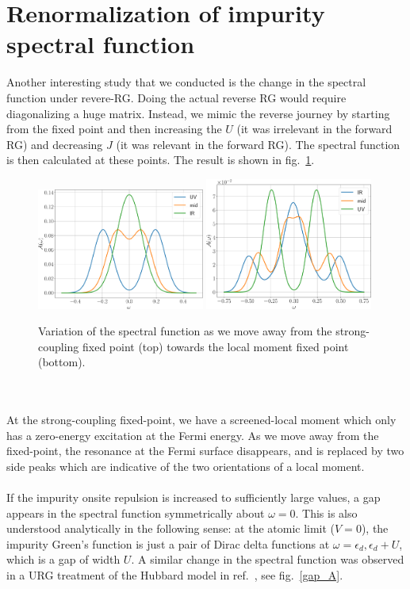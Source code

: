 \documentclass[twoside]{report}
\numberwithin{equation}{section}
\begin{document}
\section{Renormalization of impurity spectral function}
Another interesting study that we conducted is the change in the spectral function under revere-RG. Doing the actual reverse RG would require diagonalizing a huge matrix. Instead, we mimic the reverse journey by starting from the fixed point and then increasing the \(U\) (it was irrelevant in the forward RG) and decreasing \(J\) (it was relevant in the forward RG). The spectral function is then calculated at these points. The result is shown in fig.~\ref{spec_rev}.
\begin{figure}[htpb]
	\centering
	\includegraphics[width=0.49\textwidth]{../figures/spec_func_journey_one.pdf}
	\includegraphics[width=0.49\textwidth]{../figures/spec_func_journey_three.pdf}
	\caption{Variation of the spectral function as we move away from the strong-coupling fixed point (top) towards the local moment fixed point (bottom).}
	\label{spec_rev}
\end{figure}
\\\\At the strong-coupling fixed-point, we have a screened-local moment which only has a zero-energy excitation at the Fermi energy. As we move away from the fixed-point, the resonance at the Fermi surface disappears, and is replaced by two side peaks which are indicative of the two orientations of a local moment.
\\\\If the impurity onsite repulsion is increased to sufficiently large values, a gap appears in the spectral function symmetrically about \(\omega=0\). This is also understood analytically in the following sense: at the atomic limit (\(V=0\)), the impurity Green's function is just a pair of Dirac delta functions at \(\omega = \epsilon_d, \epsilon_d + U\), which is a gap of width \(U\). A similar change in the spectral function was observed in a URG treatment of the Hubbard model in ref.~\cite{Mukherjee_hubbard}, see fig.~\ref{gap_A}.
\end{document}
